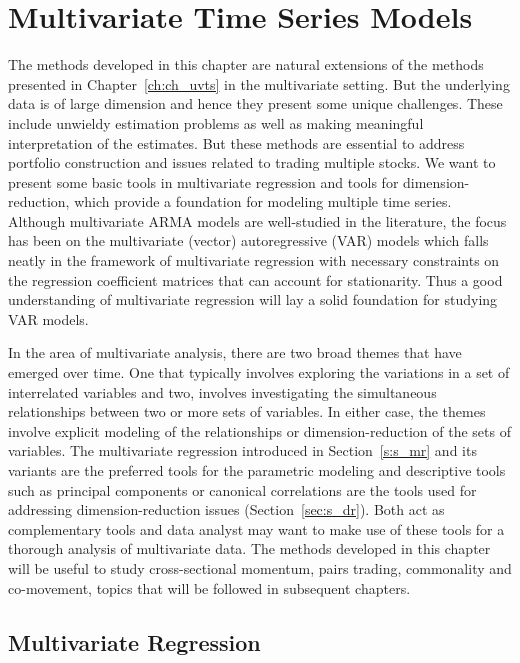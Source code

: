 \chapter{Multivariate Time Series Models \label{ch:ch_mvts}}

The methods developed in this chapter are natural extensions of the methods presented in Chapter~\ref{ch:ch_uvts} in the multivariate setting. But the underlying data is of large dimension and hence they present some unique challenges. These include unwieldy estimation problems as well as making meaningful interpretation of the estimates. But these methods are essential to address portfolio construction and issues related to trading multiple stocks. We want to present some basic tools in multivariate regression and tools for dimension-reduction, which provide a foundation for modeling multiple time series. Although multivariate ARMA models are well-studied in the literature, the focus has been on the multivariate (vector) autoregressive (VAR) models which falls neatly in the framework of multivariate regression with necessary constraints on the regression coefficient matrices that can account for stationarity. Thus a good understanding of multivariate regression will lay a solid foundation for studying VAR models.


In the area of multivariate analysis, there are two broad themes that have emerged over time. One that typically involves exploring the variations in a set of interrelated variables and two, involves investigating the simultaneous relationships between two or more sets of variables. In either case, the themes involve explicit modeling of the relationships or dimension-reduction of the sets of variables. The multivariate regression introduced in Section~\ref{s:s_mr} and its variants are the preferred tools for the parametric modeling and descriptive tools such as principal components or canonical correlations are the tools used for addressing dimension-reduction issues (Section~\ref{sec:s_dr}). Both act as complementary tools and data analyst may want to make use of these tools for a thorough analysis of multivariate data. The methods developed in this chapter will be useful to study cross-sectional momentum, pairs trading, commonality and co-movement, topics that will be followed in subsequent chapters.



\section{Multivariate Regression \label{s:s_mr}} 

